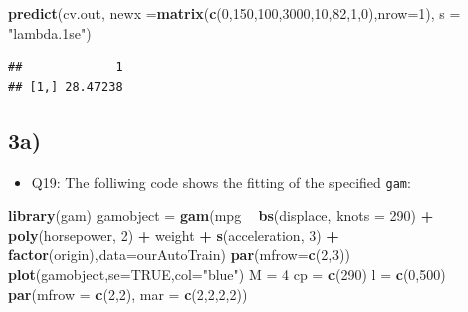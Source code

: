 \documentclass[]{article}
\newenvironment{Shaded}{\begin{snugshade}}{\end{snugshade}}
\newcommand{\KeywordTok}[1]{\textcolor[rgb]{0.13,0.29,0.53}{\textbf{#1}}}
\newcommand{\DataTypeTok}[1]{\textcolor[rgb]{0.13,0.29,0.53}{#1}}
\newcommand{\DecValTok}[1]{\textcolor[rgb]{0.00,0.00,0.81}{#1}}
\newcommand{\StringTok}[1]{\textcolor[rgb]{0.31,0.60,0.02}{#1}}
\newcommand{\OtherTok}[1]{\textcolor[rgb]{0.56,0.35,0.01}{#1}}
\newcommand{\OperatorTok}[1]{\textcolor[rgb]{0.81,0.36,0.00}{\textbf{#1}}}
\newcommand{\NormalTok}[1]{#1}
\providecommand{\tightlist}{%
  \setlength{\itemsep}{0pt}\setlength{\parskip}{0pt}}
\begin{document}
\begin{Shaded}
\begin{Highlighting}[]
\KeywordTok{predict}\NormalTok{(cv.out, }\DataTypeTok{newx =}\KeywordTok{matrix}\NormalTok{(}\KeywordTok{c}\NormalTok{(}\DecValTok{0}\NormalTok{,}\DecValTok{150}\NormalTok{,}\DecValTok{100}\NormalTok{,}\DecValTok{3000}\NormalTok{,}\DecValTok{10}\NormalTok{,}\DecValTok{82}\NormalTok{,}\DecValTok{1}\NormalTok{,}\DecValTok{0}\NormalTok{),}\DataTypeTok{nrow=}\DecValTok{1}\NormalTok{), }\DataTypeTok{s =} \StringTok{"lambda.1se"}\NormalTok{)}
\end{Highlighting}
\end{Shaded}

\begin{verbatim}
##             1
## [1,] 28.47238
\end{verbatim}

\subsection{3a)}\label{a-1}

\begin{itemize}
\tightlist
\item
  Q19: The folliwing code shows the fitting of the specified
  \texttt{gam}:
\end{itemize}

\begin{Shaded}
\begin{Highlighting}[]
\KeywordTok{library}\NormalTok{(gam)}
\NormalTok{gamobject =}\StringTok{ }\KeywordTok{gam}\NormalTok{(mpg }\OperatorTok{~}\StringTok{ }\KeywordTok{bs}\NormalTok{(displace, }\DataTypeTok{knots  =} \DecValTok{290}\NormalTok{) }\OperatorTok{+}\StringTok{ }\KeywordTok{poly}\NormalTok{(horsepower, }\DecValTok{2}\NormalTok{)  }\OperatorTok{+}\StringTok{ }\NormalTok{weight }\OperatorTok{+}\StringTok{ }\KeywordTok{s}\NormalTok{(acceleration, }\DecValTok{3}\NormalTok{) }\OperatorTok{+}\StringTok{ }\KeywordTok{factor}\NormalTok{(origin),}\DataTypeTok{data=}\NormalTok{ourAutoTrain)}
\KeywordTok{par}\NormalTok{(}\DataTypeTok{mfrow=}\KeywordTok{c}\NormalTok{(}\DecValTok{2}\NormalTok{,}\DecValTok{3}\NormalTok{))}
\KeywordTok{plot}\NormalTok{(gamobject,}\DataTypeTok{se=}\OtherTok{TRUE}\NormalTok{,}\DataTypeTok{col=}\StringTok{"blue"}\NormalTok{)}
\NormalTok{M =}\StringTok{ }\DecValTok{4}
\NormalTok{cp =}\StringTok{ }\KeywordTok{c}\NormalTok{(}\DecValTok{290}\NormalTok{)}
\NormalTok{l =}\StringTok{ }\KeywordTok{c}\NormalTok{(}\DecValTok{0}\NormalTok{,}\DecValTok{500}\NormalTok{)}
\KeywordTok{par}\NormalTok{(}\DataTypeTok{mfrow =} \KeywordTok{c}\NormalTok{(}\DecValTok{2}\NormalTok{,}\DecValTok{2}\NormalTok{), }\DataTypeTok{mar =} \KeywordTok{c}\NormalTok{(}\DecValTok{2}\NormalTok{,}\DecValTok{2}\NormalTok{,}\DecValTok{2}\NormalTok{,}\DecValTok{2}\NormalTok{))}
\end{Highlighting}
\end{Shaded}
\end{document}
